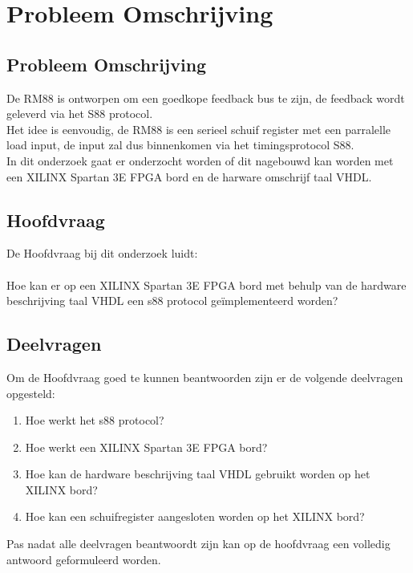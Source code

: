 \chapter{Probleem Omschrijving}
\section{Probleem Omschrijving}

De RM88 is ontworpen om een goedkope feedback bus te zijn, de feedback wordt geleverd via het S88 protocol.\\
Het idee is eenvoudig, de RM88 is een serieel schuif register met een parralelle load input, de input zal dus binnenkomen via het timingsprotocol S88.\\
In dit onderzoek gaat er onderzocht worden of dit nagebouwd kan worden met een XILINX Spartan 3E FPGA bord en de harware omschrijf taal VHDL.


\section{Hoofdvraag}
De Hoofdvraag bij dit onderzoek luidt:
\\\\
Hoe kan er op een XILINX Spartan 3E FPGA bord met behulp van de hardware beschrijving taal VHDL een s88 protocol geïmplementeerd worden?
\\

\section{Deelvragen}
Om de Hoofdvraag goed te kunnen beantwoorden zijn er de volgende deelvragen opgesteld:

\begin{enumerate}
	\item Hoe werkt het s88 protocol?
	\item Hoe werkt een XILINX Spartan 3E FPGA bord?
	\item Hoe kan de hardware beschrijving taal VHDL gebruikt worden op het XILINX bord?
	\item Hoe kan een schuifregister aangesloten worden op het XILINX bord?
\end{enumerate}

Pas nadat alle deelvragen beantwoordt zijn kan op de hoofdvraag een volledig antwoord geformuleerd worden.